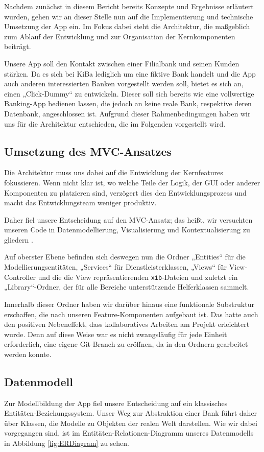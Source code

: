 	Nachdem zunächst in diesem Bericht bereits Konzepte und Ergebnisse erläutert wurden, gehen wir an dieser Stelle nun auf die Implementierung und technische Umsetzung der App ein. Im Fokus dabei steht die Architektur, die maßgeblich zum Ablauf der Entwicklung und zur Organisation der Kernkomponenten beiträgt.
	
	Unsere App soll den Kontakt zwischen einer Filialbank und seinen Kunden stärken. Da es sich bei KiBa lediglich um eine fiktive Bank handelt und die App auch anderen interessierten Banken vorgestellt werden soll, bietet es sich an, einen „Click-Dummy“ zu entwickeln. Dieser soll sich bereits wie eine vollwertige Banking-App bedienen lassen, die jedoch an keine reale Bank, respektive deren Datenbank, angeschlossen ist. Aufgrund dieser Rahmenbedingungen haben wir uns für die Architektur entschieden, die im Folgenden vorgestellt wird.

\subsection{Umsetzung des MVC-Ansatzes}
	Die Architektur muss uns dabei auf die Entwicklung der Kernfeatures fokussieren. Wenn nicht klar ist, wo welche Teile der Logik, der GUI oder anderer Komponenten zu platzieren sind, verzögert dies den Entwicklungsprozess und macht das Entwicklungsteam weniger produktiv.
	
	Daher fiel unsere Entscheidung auf den MVC-Ansatz; das heißt, wir versuchten unseren Code in Datenmodellierung, Visualisierung und Kontextualisierung zu gliedern \citep{Tutorialspoint14}.
	
	Auf oberster Ebene befinden sich deswegen nun die Ordner „Entities“ für die Modellierungsentitäten, „Services“ für Dienstleisterklassen, „Views“ für View-Controller und die die View repräsentierenden \texttt{xib}-Dateien und zuletzt ein „Library“-Ordner, der für alle Bereiche unterstützende Helferklassen sammelt.
	
	Innerhalb dieser Ordner haben wir darüber hinaus eine funktionale Substruktur erschaffen, die nach unseren Feature-Komponenten aufgebaut ist. Das hatte auch den positiven Nebeneffekt, dass kollaboratives Arbeiten am Projekt erleichtert wurde. Denn auf diese Weise war es nicht zwangsläufig für jede Einheit erforderlich, eine eigene Git-Branch zu eröffnen, da in den Ordnern gearbeitet werden konnte.

\subsection{Datenmodell}	
	Zur Modellbildung der App fiel unsere Entscheidung auf ein klassisches Entitäten-Be\-zieh\-ungs\-sys\-tem. Unser Weg zur Abstraktion einer Bank führt daher	über Klassen, die Modelle zu Objekten der realen Welt darstellen. Wie wir dabei vorgegangen sind, ist im Entitäten-Relationen-Diagramm unseres Datenmodells in Abbildung \ref{fig:ERDiagram} zu sehen.
	
